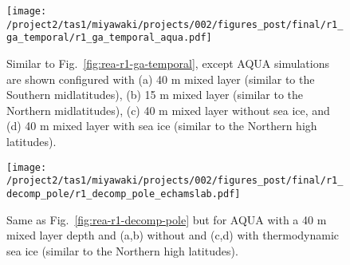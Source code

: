 \documentclass{ametsocV5}
\begin{document}

\begin{figure}
  \noindent\texttt{[image: /project2/tas1/miyawaki/projects/002/figures\_post/final/r1\_ga\_temporal/r1\_ga\_temporal\_aqua.pdf]}\\
    \caption{Similar to Fig.~\ref{fig:rea-r1-ga-temporal}, except AQUA simulations are shown configured with (a) 40 m mixed layer (similar to the Southern midlatitudes), (b) 15 m mixed layer (similar to the Northern midlatitudes), (c) 40 m mixed layer without sea ice, and (d) 40 m mixed layer with sea ice (similar to the Northern high latitudes).}
    \label{fig:echam-r1-ga-temporal}
\end{figure}


\begin{figure}[t]
    \noindent\texttt{[image: /project2/tas1/miyawaki/projects/002/figures\_post/final/r1\_decomp\_pole/r1\_decomp\_pole\_echamslab.pdf]}\\
    \caption{Same as Fig.~\ref{fig:rea-r1-decomp-pole} but for AQUA with a 40 m mixed layer depth and (a,b) without and (c,d) with thermodynamic sea ice (similar to the Northern high latitudes).}
    \label{fig:echam-rae}
\end{figure}
\end{document}
